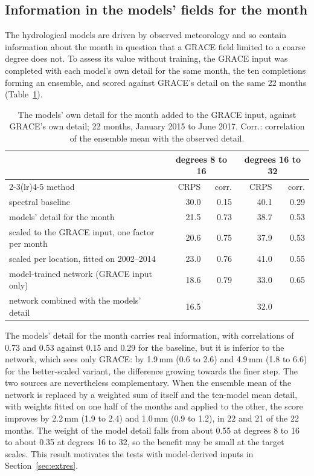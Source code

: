 \documentclass[11pt,a4paper]{article}
\begin{document}
\subsection{Information in the models' fields for the month}\label{sec:month}
The hydrological models are driven by observed meteorology and so contain information about
the month in question that a GRACE field limited to a coarse degree does not. To assess its
value without training, the GRACE input was completed with each model's own detail for the same
month, the ten completions forming an ensemble, and scored against GRACE's detail on the same
22 months (Table~\ref{tab:month}).

\begin{table}[ht]
\centering\small
\caption{The models' own detail for the month added to the GRACE input, against GRACE's own
detail; 22 months, January 2015 to June 2017. Corr.: correlation of the ensemble mean with the
observed detail.}
\label{tab:month}
\begin{tabular}{lrrrr}
  \toprule
  & \multicolumn{2}{c}{degrees 8 to 16} & \multicolumn{2}{c}{degrees 16 to 32} \\
  \cmidrule(lr){2-3}\cmidrule(lr){4-5}
  method & CRPS & corr. & CRPS & corr. \\
  \midrule
  spectral baseline & 30.0 & 0.15 & 40.1 & 0.29 \\
  models' detail for the month & 21.5 & 0.73 & 38.7 & 0.53 \\
  \quad scaled to the GRACE input, one factor per month & 20.6 & 0.75 & 37.9 & 0.53 \\
  \quad scaled per location, fitted on 2002--2014 & 23.0 & 0.76 & 41.0 & 0.55 \\
  model-trained network (GRACE input only) & 18.6 & 0.79 & 33.0 & 0.65 \\
  network combined with the models' detail & 16.5 & & 32.0 & \\
  \bottomrule
\end{tabular}
\end{table}

The models' detail for the month carries real information, with correlations of 0.73 and 0.53
against 0.15 and 0.29 for the baseline, but it is inferior to the network, which sees only
GRACE: by 1.9\,mm (0.6 to 2.6) and 4.9\,mm (1.8 to 6.6) for the better-scaled variant, the
difference growing towards the finer step. The two sources are nevertheless complementary.
When the ensemble mean of the network is replaced by a weighted sum of itself and the
ten-model mean detail, with weights fitted on one half of the months and applied to the other,
the score improves by 2.2\,mm (1.9 to 2.4) and 1.0\,mm (0.9 to 1.2), in 22 and 21 of the 22
months. The weight of the model detail falls from about 0.55 at degrees 8 to 16 to about 0.35
at degrees 16 to 32, so the benefit may be small at the target scales. This result motivates
the tests with model-derived inputs in Section~\ref{sec:extres}.
\end{document}
